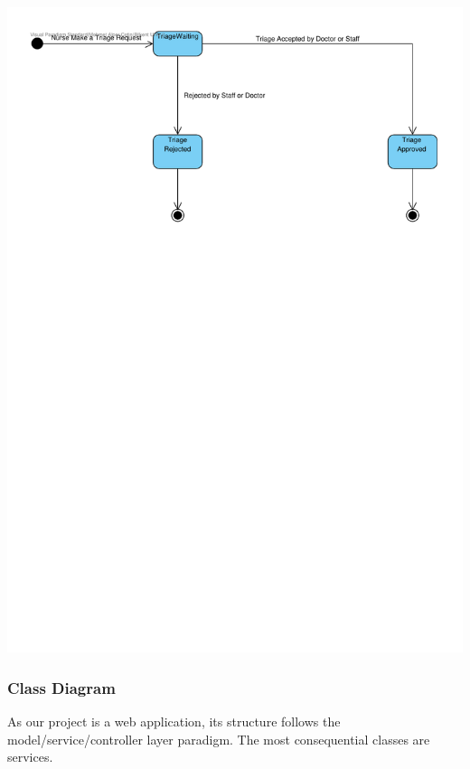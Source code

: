 \documentclass[a4paper, 12pt, titlepage]{article}
\begin{document}
  \includegraphics[width=\linewidth]{state_diag_triage}

  \pagebreak
  \subsubsection{Class Diagram}

  As our project is a web application, its structure follows the model/service/controller layer paradigm.
  The most consequential classes are services.
\end{document}
